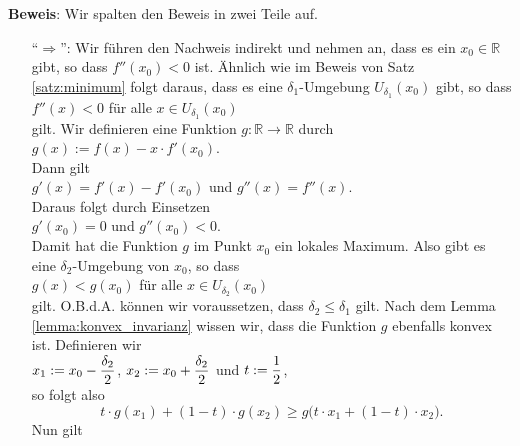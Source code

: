 \noindent
\textbf{Beweis}: Wir spalten den Beweis in zwei Teile auf.
\begin{enumerate}
\item[``$\Rightarrow$'':] Wir f\"uhren den Nachweis indirekt und nehmen an, dass es ein $x_0 \in \mathbb{R}$
  gibt, so dass $f''(x_0) < 0$ ist.  \"Ahnlich wie im Beweis von Satz \ref{satz:minimum} folgt daraus, dass
  es eine $\delta_1$-Umgebung $U_{\delta_1}(x_0)$ gibt, so dass
  \\[0.2cm]
  \hspace*{1.3cm} $f''(x) < 0$ \quad f\"ur alle $x \in U_{\delta_1}(x_0)$ 
  \\[0.2cm]
  gilt.  Wir definieren eine Funktion $g:\mathbb{R} \rightarrow \mathbb{R}$ durch
  \\[0.2cm]
  \hspace*{1.3cm}
  $g(x) := f(x) - x \cdot f'(x_0)$.
  \\[0.2cm]
  Dann gilt 
  \\[0.2cm]
  \hspace*{1.3cm}
  $g'(x) = f'(x) - f'(x_0)$ \quad und \quad $g''(x) = f''(x)$.
  \\[0.2cm]
  Daraus folgt durch Einsetzen
  \\[0.2cm]
  \hspace*{1.3cm}
  $g'(x_0) = 0$ \quad und \quad $g''(x_0) < 0$.
  \\[0.2cm]
  Damit hat die Funktion $g$ im Punkt $x_0$ ein lokales Maximum.  Also gibt es eine $\delta_2$-Umgebung von
  $x_0$, so dass
  \\[0.2cm]
  \hspace*{1.3cm}
  $g(x) < g(x_0)$ \quad f\"ur alle $x \in U_{\delta_2}(x_0)$
  \\[0.2cm]
  gilt.  O.B.d.A. k\"onnen wir voraussetzen, dass $\delta_2 \leq \delta_1$ gilt.  
  Nach dem Lemma \ref{lemma:konvex_invarianz} wissen wir, dass die Funktion $g$ ebenfalls konvex ist.
  Definieren wir
\\[0.2cm]
\hspace*{1.3cm}
 $\displaystyle x_1 := x_0 - \frac{\delta_2}{2}$, \quad $\displaystyle x_2 := x_0 + \frac{\delta_2}{2}$ \quad und \quad $\displaystyle t := \frac{1}{2}$,
\\[0.2cm]
  so folgt also
  \begin{equation}
    \label{eq:konvex1}
  t \cdot g(x_1) + (1 - t) \cdot g(x_2) \geq g\bigl(t \cdot x_1 + (1-t) \cdot x_2\bigr).
  \end{equation}
  Nun gilt 
  \\[-0.2cm]
  \hspace*{1.3cm}

\end{enumerate}
